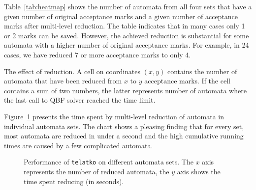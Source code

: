 \documentclass[a4paper,UKenglish,cleveref,autoref,thm-restate]{lipics-v2021}
\newcommand{\telatko}{\texttt{telatko}\xspace}
\begin{document}
Table~\ref{tab:heatmap} shows the number of automata from all
four sets that have a given number of original acceptance marks and a
given number of acceptance marks after multi-level reduction. The
table indicates that in many cases only 1 or 2 marks can be
saved. However, the achieved reduction is substantial for some
automata with a higher number of original acceptance marks. For
example, in 24 cases, we have reduced 7 or more
acceptance marks to only 4.

\begin{table}[t]
\caption{The effect of reduction.
A cell on coordinates $(x,y)$ contains the number of automata that have been
reduced from $x$ to $y$ acceptance marks. If the cell contains a sum of two
numbers, the latter represents number of automata where the last call to QBF
solver reached the time limit.}
\label{tab:heatmap}
\setlength{\tabcolsep}{4pt}
\centering

\end{table}

Figure~\ref{fig:quantile} presents the time spent by multi-level
reduction of automata in individual automata sets. The chart shows a
pleasing finding that for every set, most automata are reduced in
under a second and the high cumulative running times are caused by
a few complicated automata.

\begin{figure}[b!]
\caption{Performance of \telatko on different automata sets. The $x$ axis
represents the number of reduced automata, the $y$ axis shows the time spent
reducing (in seconds).}
\label{fig:quantile}
\centering

\end{figure}



\end{document}
